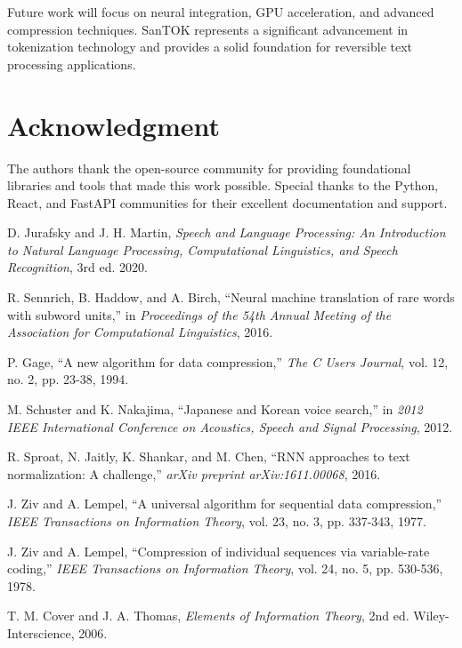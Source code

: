 \documentclass[conference]{IEEEtran}
\begin{document}
Future work will focus on neural integration, GPU acceleration, and advanced compression techniques. SanTOK represents a significant advancement in tokenization technology and provides a solid foundation for reversible text processing applications.

\section*{Acknowledgment}

The authors thank the open-source community for providing foundational libraries and tools that made this work possible. Special thanks to the Python, React, and FastAPI communities for their excellent documentation and support.

\begin{thebibliography}{00}
 D. Jurafsky and J. H. Martin, \emph{Speech and Language Processing: An Introduction to Natural Language Processing, Computational Linguistics, and Speech Recognition}, 3rd ed. 2020.

 R. Sennrich, B. Haddow, and A. Birch, ``Neural machine translation of rare words with subword units,'' in \emph{Proceedings of the 54th Annual Meeting of the Association for Computational Linguistics}, 2016.

 P. Gage, ``A new algorithm for data compression,'' \emph{The C Users Journal}, vol. 12, no. 2, pp. 23-38, 1994.

 M. Schuster and K. Nakajima, ``Japanese and Korean voice search,'' in \emph{2012 IEEE International Conference on Acoustics, Speech and Signal Processing}, 2012.

 R. Sproat, N. Jaitly, K. Shankar, and M. Chen, ``RNN approaches to text normalization: A challenge,'' \emph{arXiv preprint arXiv:1611.00068}, 2016.

 J. Ziv and A. Lempel, ``A universal algorithm for sequential data compression,'' \emph{IEEE Transactions on Information Theory}, vol. 23, no. 3, pp. 337-343, 1977.

 J. Ziv and A. Lempel, ``Compression of individual sequences via variable-rate coding,'' \emph{IEEE Transactions on Information Theory}, vol. 24, no. 5, pp. 530-536, 1978.

 T. M. Cover and J. A. Thomas, \emph{Elements of Information Theory}, 2nd ed. Wiley-Interscience, 2006.
\end{thebibliography}
\end{document}
